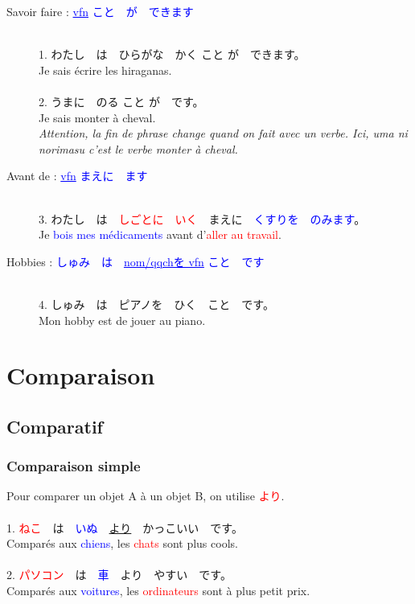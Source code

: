 \documentclass[11pt]{report}
\newenvironment{Japanese}{%
\CJKfamily{min}%
\CJKtilde  
\CJKnospace}{}
\begin{document}
\begin{CJK}{UTF8}{}  
\begin{Japanese}
	\begin{description}
		\item[Savoir faire : \textcolor{blue}{\underline{vfn} こと　が　できます}] \hfill \\
		1. わたし　は　ひらがな　かく こと が　できます。 \\
		Je sais écrire les hiraganas. \\ \\
		2. うまに　のる こと が　です。 \\
		Je sais monter \`a cheval. \\
		\emph{Attention, la fin de phrase change quand on fait avec un verbe. Ici, uma ni norimasu c'est le verbe monter \`a cheval.}
		\item[Avant de : \textcolor{blue}{\underline{vfn} まえに　\underline{\qquad}ます}] \hfill \\
		3. わたし　は　\textcolor{red}{しごとに　いく}　まえに　\textcolor{blue}{くすりを　のみます}。 \\
		Je \textcolor{blue}{bois mes médicaments} avant d'\textcolor{red}{aller au travail}.
		\item[Hobbies : \textcolor{blue}{しゅみ　は　\underline{nom/qqchを vfn} こと　です}] \hfill \\
		4. しゅみ　は　ピアノを　ひく　こと　です。 \\
		Mon hobby est de jouer au piano.
	\end{description}
\end{Japanese}  
\end{CJK}

\chapter{Comparaison}

\section{Comparatif}

\subsection{Comparaison simple}

\begin{CJK}{UTF8}{}  
\begin{Japanese}
	Pour comparer un objet A \`a un objet B, on utilise \textcolor{red}{より}. \\ \\
	1. \textcolor{red}{ねこ}　は　\textcolor{blue}{いぬ}　\underline{より}　かっこいい　です。 \\
	Comparés aux \textcolor{blue}{chiens}, les \textcolor{red}{chats} sont plus cools. \\ \\
	2. \textcolor{red}{パソコン}　は　\textcolor{blue}{車}　より　やすい　です。 \\
	Comparés aux \textcolor{blue}{voitures}, les \textcolor{red}{ordinateurs} sont \`a plus petit prix.
\end{Japanese}  
\end{CJK}
\end{document}
